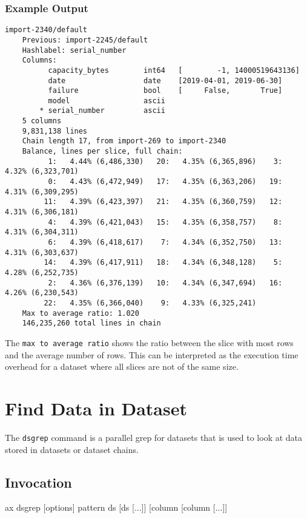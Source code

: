 \subsubsection*{Example Output}
\begin{snugshade}
\begin{verbatim}
import-2340/default
    Previous: import-2245/default
    Hashlabel: serial_number
    Columns:
          capacity_bytes        int64   [        -1, 14000519643136]
          date                  date    [2019-04-01, 2019-06-30]
          failure               bool    [     False,       True]
          model                 ascii
        * serial_number         ascii
    5 columns
    9,831,138 lines
    Chain length 17, from import-269 to import-2340
    Balance, lines per slice, full chain:
          1:   4.44% (6,486,330)   20:   4.35% (6,365,896)    3:   4.32% (6,323,701)
          0:   4.43% (6,472,949)   17:   4.35% (6,363,206)   19:   4.31% (6,309,295)
         11:   4.39% (6,423,397)   21:   4.35% (6,360,759)   12:   4.31% (6,306,181)
          4:   4.39% (6,421,043)   15:   4.35% (6,358,757)    8:   4.31% (6,304,311)
          6:   4.39% (6,418,617)    7:   4.34% (6,352,750)   13:   4.31% (6,303,637)
         14:   4.39% (6,417,911)   18:   4.34% (6,348,128)    5:   4.28% (6,252,735)
          2:   4.36% (6,376,139)   10:   4.34% (6,347,694)   16:   4.26% (6,230,543)
         22:   4.35% (6,366,040)    9:   4.33% (6,325,241)
    Max to average ratio: 1.020
    146,235,260 total lines in chain
\end{verbatim}
\end{snugshade}
The \texttt{max to average ratio} shows the ratio between the slice
with most rows and the average number of rows.  This can be
interpreted as the execution time overhead for a dataset where all
slices are not of the same size.







\section{Find Data in Dataset}
The \texttt{dsgrep} command is a parallel grep for datasets that is
used to look at data stored in datasets or dataset chains.
\subsection{Invocation}
\begin{shell}
ax dsgrep [options] pattern ds [ds [...]] [column [column [...]]
\end{shell}


